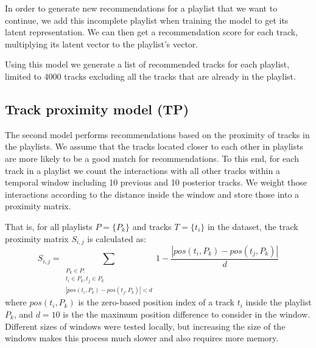 In order to generate new recommendations for a playlist that we want to continue,  we add this incomplete playlist when training the model to get its latent representation. We can then get a recommendation score for each track, multiplying its latent vector to the playlist's vector.

Using this model we generate a list of recommended tracks for each playlist, limited to 4000 tracks excluding all the tracks that are already in the playlist.


\subsection{Track proximity model (TP)}


The second model performs recommendations based on the proximity of tracks in the playlists. We assume that the tracks located closer to each other in playlists are more likely to be a good match for recommendations. To this end, for each track in a playlist we count the interactions with all other tracks within a temporal window including 10 previous and 10 posterior tracks. We weight those interactions according to the distance inside the window and store those into a proximity matrix. 

That is, for all playlists $P = \{ P_{k} \}$ and tracks $T = \{ t_{i} \}$ in the dataset, the track proximity matrix $S_{i,j}$ is calculated as: 
\begin{displaymath}
  S_{i,j} = \sum_{\substack{P_{k} \in P :\\ t_{i} \in P_{k} , t_{j} \in P_{k} \\ |pos(t_{i}, P_{k}) - pos(t_{j},P_{k})| < d}} 1 - \frac{ |pos(t_{i}, P_{k}) - pos(t_{j},P_{k})|}{d}
\end{displaymath}
where $pos(t_{i}, P_{k})$ is the zero-based position index of a track $t_{i}$ inside the playlist $P_{k}$, and $d=10$ is the the maximum position difference to consider in the window. Different sizes of windows were tested locally, but increasing the size of the windows makes this process much slower and also requires more memory.

\iffalse
\begin{algorithm}
    \SetKwInOut{Input}{Input}
    \SetKwInOut{Output}{Output}
    \underline{Function fill\_proximity\_matrix} $(ps)$\;
    \Input{List with all playlists $ps$}
    \Output{track proximity matrix $c\_matrix$}
    \For{$p$ in $ps$}{
    $current\_windows$ = [] \\
    \For{$track\_x$ in $p$}{
    $distance$ = 1 \\
    \For{$t$ in $current\_windows$}{
    $c\_matrix$[$track\_x$][$t$] += $distance$ / 10 \\
    $c\_matrix$[$t$][$track\_x$] += $distance$ / 10 \\
    $distance$ += 1 \\
    }
    \If{len($current\_windows$) == 10}
      {
        $current\_windows$.pop()
       }
       $current\_windows$.push($track\_x$)
    }
    }
    \caption{Function to calculate the proximity of tracks in the playlists weighted by proximity.}
    \label{alg:fill}
\end{algorithm}
\fi

